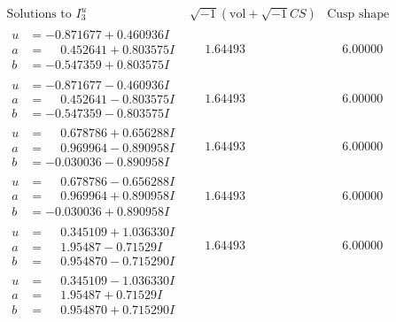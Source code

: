 \documentclass[1p]{elsarticle_modified}
\theoremstyle{definition}
\newcommand{\I}{\sqrt{-1}}
\begin{document}
$$\begin{array}{c|c|c}  
\text{Solutions to }I^u_{3}& \I (\text{vol} + \sqrt{-1}CS) & \text{Cusp shape}\\
 \hline 
\begin{aligned}
u &= -0.871677 + 0.460936 I \\
a &= \phantom{-}0.452641 + 0.803575 I \\
b &= -0.547359 + 0.803575 I\end{aligned}
 & \phantom{-}1.64493\phantom{ +0.000000I} & \phantom{-}6.00000\phantom{ +0.000000I} \\ \hline\begin{aligned}
u &= -0.871677 - 0.460936 I \\
a &= \phantom{-}0.452641 - 0.803575 I \\
b &= -0.547359 - 0.803575 I\end{aligned}
 & \phantom{-}1.64493\phantom{ +0.000000I} & \phantom{-}6.00000\phantom{ +0.000000I} \\ \hline\begin{aligned}
u &= \phantom{-}0.678786 + 0.656288 I \\
a &= \phantom{-}0.969964 - 0.890958 I \\
b &= -0.030036 - 0.890958 I\end{aligned}
 & \phantom{-}1.64493\phantom{ +0.000000I} & \phantom{-}6.00000\phantom{ +0.000000I} \\ \hline\begin{aligned}
u &= \phantom{-}0.678786 - 0.656288 I \\
a &= \phantom{-}0.969964 + 0.890958 I \\
b &= -0.030036 + 0.890958 I\end{aligned}
 & \phantom{-}1.64493\phantom{ +0.000000I} & \phantom{-}6.00000\phantom{ +0.000000I} \\ \hline\begin{aligned}
u &= \phantom{-}0.345109 + 1.036330 I \\
a &= \phantom{-}1.95487 - 0.71529 I \\
b &= \phantom{-}0.954870 - 0.715290 I\end{aligned}
 & \phantom{-}1.64493\phantom{ +0.000000I} & \phantom{-}6.00000\phantom{ +0.000000I} \\ \hline\begin{aligned}
u &= \phantom{-}0.345109 - 1.036330 I \\
a &= \phantom{-}1.95487 + 0.71529 I \\
b &= \phantom{-}0.954870 + 0.715290 I\end{aligned}

\end{array}$$
\end{document}

